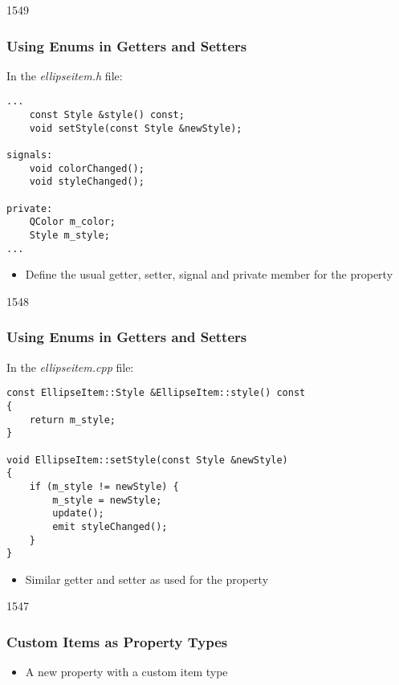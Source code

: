 \begin{slide}[fragile]{1549}\frametitle{Using Enums in Getters and Setters}

In the \textit{ellipseitem.h} file:

\vspace*{0.25em}
\begin{lstlisting}
...
    const Style &style() const;
    void setStyle(const Style &newStyle);

signals:
    void colorChanged();
    void styleChanged();

private:
    QColor m_color;
    Style m_style;
...
\end{lstlisting}

\begin{itemize}
\item Define the usual getter, setter, signal and private member for the
       property
\end{itemize}

\end{slide}

\begin{slide}[fragile]{1548}\frametitle{Using Enums in Getters and Setters}

In the \textit{ellipseitem.cpp} file:

\vspace*{0.25em}
\begin{lstlisting}
const EllipseItem::Style &EllipseItem::style() const
{
    return m_style;
}

void EllipseItem::setStyle(const Style &newStyle)
{
    if (m_style != newStyle) {
        m_style = newStyle;
        update();
        emit styleChanged();
    }
}
\end{lstlisting}

\begin{itemize}
\item Similar getter and setter as used for the  property
\end{itemize}

\end{slide}

\begin{slide}[fragile]{1547}\frametitle{Custom Items as Property Types}


\begin{itemize}
\item A new  property with a custom item type
\end{itemize}

\end{slide}

